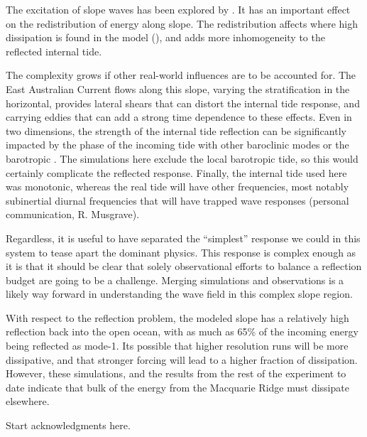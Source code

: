 \documentclass[10pt]{article}
\begin{document}
The excitation of slope waves has been explored by \citet{daleetal01}. It has an important effect on the redistribution of energy along slope.  The redistribution affects where high dissipation is found in the model (), and adds more inhomogeneity to the reflected internal tide.    

The complexity grows if other real-world influences are to be accounted for.  The East Australian Current flows along this slope, varying the stratification in the horizontal, provides lateral shears that can distort the internal tide response, and carrying eddies that can add a strong time dependence to these effects.  Even in two dimensions, the strength of the  internal tide reflection can be significantly impacted by the phase of the incoming tide with other baroclinic modes \citet{klymaketal11a} or the barotropic \citep{kellynash10}.
The simulations here exclude the local barotropic tide, so this would certainly complicate the reflected response.  Finally, the internal tide used here was monotonic, whereas the real tide will have other frequencies, most notably subinertial diurnal frequencies that will have trapped wave responses (personal communication, R. Musgrave).  

Regardless, it is useful to have separated the ``simplest'' response we could in this system to tease apart the dominant physics.  This response is complex enough as it is that it should be clear that solely observational efforts to balance a reflection budget are going to be a challenge.  Merging simulations and observations is a likely way forward in understanding the wave field in this complex slope region.

With respect to the reflection problem, the modeled slope has a relatively high reflection back into the open ocean, with as much as 65\% of the incoming energy being reflected as mode-1.  Its possible that higher resolution runs will be more dissipative, and that stronger forcing will lead to a higher fraction of dissipation.  However, these simulations, and the results from the rest of the experiment to date \citep[i.e.][]{johnstonetal15} indicate that bulk of the energy from the Macquarie Ridge must dissipate elsewhere.  

\begin{acknowledgment} 
Start acknowledgments here.
\end{acknowledgment}
\end{document}
